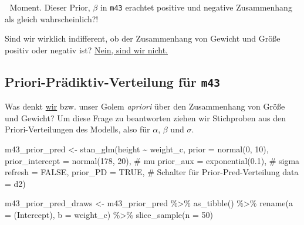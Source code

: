 \documentclass[
  a4paper,
  DIV=11]{scrreprt}
\newenvironment{Shaded}{\begin{snugshade}}{\end{snugshade}}
\newcommand{\AttributeTok}[1]{\textcolor[rgb]{0.40,0.45,0.13}{#1}}
\newcommand{\CommentTok}[1]{\textcolor[rgb]{0.37,0.37,0.37}{#1}}
\newcommand{\ConstantTok}[1]{\textcolor[rgb]{0.56,0.35,0.01}{#1}}
\newcommand{\DecValTok}[1]{\textcolor[rgb]{0.68,0.00,0.00}{#1}}
\newcommand{\FloatTok}[1]{\textcolor[rgb]{0.68,0.00,0.00}{#1}}
\newcommand{\FunctionTok}[1]{\textcolor[rgb]{0.28,0.35,0.67}{#1}}
\newcommand{\NormalTok}[1]{\textcolor[rgb]{0.00,0.23,0.31}{#1}}
\newcommand{\OtherTok}[1]{\textcolor[rgb]{0.00,0.23,0.31}{#1}}
\newcommand{\SpecialCharTok}[1]{\textcolor[rgb]{0.37,0.37,0.37}{#1}}
\newcommand{\StringTok}[1]{\textcolor[rgb]{0.13,0.47,0.30}{#1}}
\theoremstyle{definition}
\theoremstyle{remark}
\begin{document}
🤔 Moment. Dieser Prior, \(\beta\) in \texttt{m43} erachtet positive und
negative Zusammenhang als gleich wahrscheinlich?!

Sind wir wirklich indifferent, ob der Zusammenhang von Gewicht und Größe
positiv oder negativ ist?
\href{https://media.giphy.com/media/daPCSjwus6UR2JxRX1/giphy.gif}{Nein,
sind wir nicht.}

\hypertarget{priori-pruxe4diktiv-verteilung-fuxfcr-m43}{%
\subsection{\texorpdfstring{Priori-Prädiktiv-Verteilung für
\texttt{m43}}{Priori-Prädiktiv-Verteilung für m43}}\label{priori-pruxe4diktiv-verteilung-fuxfcr-m43}}

Was denkt
\href{https://media.giphy.com/media/Aausss8uUBIe3bZ3d2/giphy.gif}{wir}
bzw. unser Golem \emph{apriori} über den Zusammenhang von Größe und
Gewicht? Um diese Frage zu beantworten ziehen wir Stichproben aus den
Priori-Verteilungen des Modells, also für \(\alpha\), \(\beta\) und
\(\sigma\).

\begin{Shaded}
\begin{Highlighting}[]
\NormalTok{m43\_prior\_pred }\OtherTok{\textless{}{-}}
    \FunctionTok{stan\_glm}\NormalTok{(height }\SpecialCharTok{\textasciitilde{}}\NormalTok{ weight\_c, }
             \AttributeTok{prior =} \FunctionTok{normal}\NormalTok{(}\DecValTok{0}\NormalTok{, }\DecValTok{10}\NormalTok{),}
             \AttributeTok{prior\_intercept =} \FunctionTok{normal}\NormalTok{(}\DecValTok{178}\NormalTok{, }\DecValTok{20}\NormalTok{),  }\CommentTok{\# mu}
             \AttributeTok{prior\_aux =} \FunctionTok{exponential}\NormalTok{(}\FloatTok{0.1}\NormalTok{),  }\CommentTok{\# sigma}
             \AttributeTok{refresh =} \ConstantTok{FALSE}\NormalTok{, }
             \AttributeTok{prior\_PD =} \ConstantTok{TRUE}\NormalTok{,  }\CommentTok{\# Schalter für Prior{-}Pred{-}Verteilung}
             \AttributeTok{data =}\NormalTok{ d2)}


\NormalTok{m43\_prior\_pred\_draws }\OtherTok{\textless{}{-}} 
\NormalTok{  m43\_prior\_pred }\SpecialCharTok{\%\textgreater{}\%} 
  \FunctionTok{as\_tibble}\NormalTok{() }\SpecialCharTok{\%\textgreater{}\%} 
  \FunctionTok{rename}\NormalTok{(}\AttributeTok{a =} \StringTok{\textasciigrave{}}\AttributeTok{(Intercept)}\StringTok{\textasciigrave{}}\NormalTok{,}
         \AttributeTok{b =}\NormalTok{ weight\_c) }\SpecialCharTok{\%\textgreater{}\%} 
  \FunctionTok{slice\_sample}\NormalTok{(}\AttributeTok{n =} \DecValTok{50}\NormalTok{)}
\end{Highlighting}
\end{Shaded}
\end{document}
